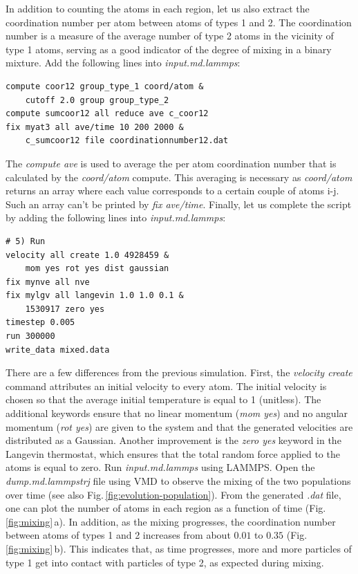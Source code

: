\documentclass[9pt,tutorial]{livecoms}
\begin{document}
In addition to counting the atoms in each region, let us also extract the coordination number per atom between atoms of types 1 and 2. The coordination number is a measure of the average number of type 2 atoms in the vicinity of type 1 atoms, serving as a good indicator of the degree of mixing in a binary mixture. Add the following lines into \textit{input.md.lammps}:
{\normalsize \begin{verbatim}
compute coor12 group_type_1 coord/atom &
    cutoff 2.0 group group_type_2
compute sumcoor12 all reduce ave c_coor12
fix myat3 all ave/time 10 200 2000 &
    c_sumcoor12 file coordinationnumber12.dat
\end{verbatim}}
The \textit{compute ave} is used to average the per atom coordination number that is calculated by the \textit{coord/atom} compute. This averaging is necessary as \textit{coord/atom} returns an array where each value corresponds to a certain couple of atoms i-j. Such an array can't be printed by \textit{fix ave/time}. Finally, let us complete the script by adding the following lines into \textit{input.md.lammps}:
{\normalsize \begin{verbatim}
# 5) Run
velocity all create 1.0 4928459 &
    mom yes rot yes dist gaussian
fix mynve all nve
fix mylgv all langevin 1.0 1.0 0.1 &
    1530917 zero yes
timestep 0.005
run 300000
write_data mixed.data
\end{verbatim}}
There are a few differences from the previous simulation. First, the \textit{velocity create} command attributes an initial velocity to every atom.
The initial velocity is chosen so that the average initial temperature is equal to 1 (unitless). The additional keywords ensure that no linear momentum (\textit{mom yes}) and no angular momentum (\textit{rot yes}) are given to the system and that the generated velocities are distributed as a Gaussian. Another improvement is the \textit{zero yes} keyword in the Langevin thermostat, which ensures that the total random force applied to the atoms is equal to zero. Run \textit{input.md.lammps} using LAMMPS. Open the \textit{dump.md.lammpstrj} file using VMD to observe the mixing of the two populations over time (see also Fig.\,\ref{fig:evolution-population}). From the generated \textit{.dat} file, one can plot the number of atoms in each region as a function of time (Fig.\,\ref{fig:mixing}\,a). In addition, as the mixing progresses, the coordination number between atoms of types 1 and 2 increases from about $0.01$ to $0.35$ (Fig.\,\ref{fig:mixing}\,b). This indicates that, as time progresses, more and more particles of type 1 get into contact with particles of type 2, as expected during mixing.
\end{document}
